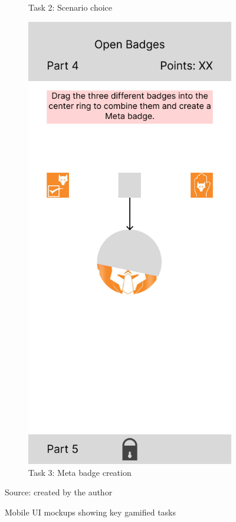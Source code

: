 \begin{figure}[H]
\begin{subfigure}[]{0.3\textwidth}
    \caption{Task 2: Scenario choice}
  \end{subfigure}
  \hfill
  \begin{subfigure}[]{0.3\textwidth}
    \includegraphics[width=\textwidth]{Media/design3.png}
    \caption{Task 3: Meta badge creation}
  \end{subfigure}
  \caption{Mobile UI mockups showing key gamified tasks}
  \label{fig:mockups}
  {\raggedright \small{Source:} created by the author\par}
\end{figure}

